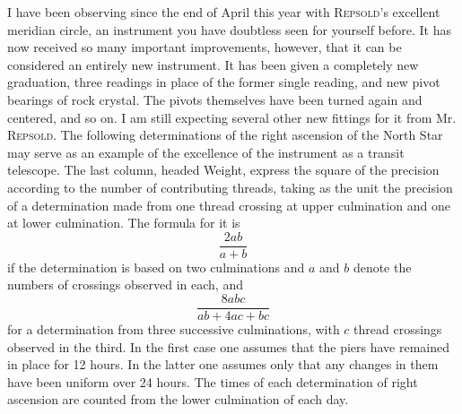 \par\indent I have been observing since the end of April this year with \textsc{Repsold}’s excellent meridian circle, an instrument you have doubtless seen for yourself before. It has now received so many important improvements, however, that it can be considered an entirely new instrument. It has been given a completely new graduation, three readings in place of the former single reading, and new pivot bearings of rock crystal. The pivots themselves have been turned again and centered, and so on. I am still expecting several other new fittings for it from Mr. \textsc{Repsold}. The following determinations of the right ascension of the North Star may serve as an example of the excellence of the instrument as a transit telescope. The last column, headed Weight, express the square of the precision according to the number of contributing threads, taking as the unit the precision of a determination made from one thread crossing at upper culmination and one at lower culmination. The formula for it is
\[
\frac{2ab}{a+b}
\]
\noindent if the determination is based on two culminations and $a$ and $b$ denote the numbers of crossings observed in each, and
\[
\frac{8abc}{ab+4ac+bc}
\]
\noindent for a determination from three successive culminations, with $c$ thread crossings observed in the third. In the first case one assumes that the piers have remained in place for 12 hours. In the latter one assumes only that any changes in them have been uniform over 24 hours. The times of each determination of right ascension are counted from the lower culmination of each day.

